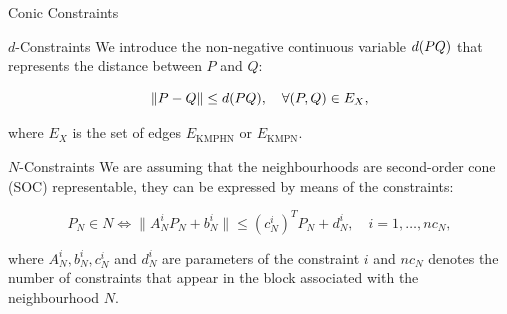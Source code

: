 \documentclass[slidestop,usepdftitle=false,10pt]{beamer}
\newcommand{\EKMPHN}{{E_{\text{KMPHN}}}}
\newcommand{\EKMPN}{{E_{\text{KMPN}}}}
\begin{document}
	\begin{frame}{Conic Constraints}
		\footnotesize
		\begin{block}{$d$-Constraints}
		We introduce the non-negative continuous variable $\dvar{PQ}$ that represents the distance between $P$ and $Q$:
		
		\begin{equation*}\label{eq:dC}
			\|P - Q\|\leq d(PQ),\quad\forall (P,Q)\in E_X,
		\end{equation*}
		
		where $E_X$ is the set of edges $\EKMPHN$ or $\EKMPN$.
		\end{block}
		
		\begin{block}{$N$-Constraints}
		We are assuming that the neighbourhoods are second-order cone (SOC) representable, they can be expressed by means of the constraints:
		
		\begin{equation*}\label{eq:nC}
			P_N\in N \Longleftrightarrow
			\|A_N^i P_N + b_N^i\| \leq (c_N^i)^T P_N + d_N^i,\quad i=1,\ldots,nc_N,
		\end{equation*}
	
		where $A_N^i, b_N^i, c_N^i$ and $d_N^i$ are parameters of the constraint $i$ and $nc_N$ denotes the number of constraints that appear in the block associated with the neighbourhood $N$.
		\end{block}
	\end{frame}

	\newcommand{\LS}[3]{L(#1|#2#3)}
	\newcommand{\US}[3]{U(#1|#2#3)}
	\newcommand{\alphamas}[3]{\alpha(#1|#2#3)}
	\newcommand{\alphamenos}[3]{\alpha^{-}(#1|#2#3)}
	\newcommand{\alphapunto}[3]{\alpha^{\cdotp}(#1|#2#3)}
	
\end{document}
